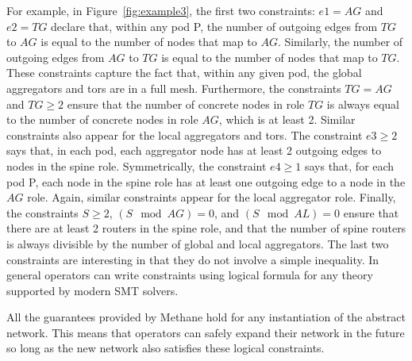 \documentclass{sig-alternate-10pt}
\newcommand{\sysname}{{\small \sf Methane}\xspace}
\begin{document}
For example, in Figure~\ref{fig:example3}, the first two constraints: $e1 = AG$ and $e2 = TG$ declare that, within any pod P, the number of outgoing edges from $TG$ to $AG$ is equal to the number of nodes that map to $AG$. Similarly, the number of outgoing edges from $AG$ to $TG$ is equal to the number of nodes that map to $TG$. These constraints capture the fact that, within any given pod, the global aggregators and tors are in a full mesh. Furthermore, the constraints $TG = AG$ and $TG \geq 2$ ensure that the number of concrete nodes in role $TG$ is always equal to the number of concrete nodes in role $AG$, which is at least 2. Similar constraints also appear for the local aggregators and tors.
%
The constraint $e3 \geq 2$ says that, in each pod, each aggregator node has at least 2 outgoing edges to nodes in the spine role. Symmetrically, the constraint $e4 \geq 1$ says that, for each pod P, each node in the spine role has at least one outgoing edge to a node in the $AG$ role. Again, similar constraints appear for the local aggregator role. Finally, the constraints $S \geq 2$, $(S \mod AG) = 0$, and $(S \mod AL) = 0$ ensure that there are at least 2 routers in the spine role, and that the number of spine routers is always divisible by the number of global and local aggregators.
%
The last two constraints are interesting in that they do not involve a simple inequality. In general operators can write constraints using logical formula for any theory supported by modern SMT solvers.

All the guarantees provided by \sysname hold for any instantiation of the abstract network. This means that operators can safely expand their network in the future so long as the new network also satisfies these logical constraints.



%
\end{document}
